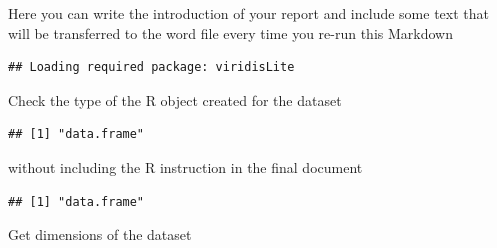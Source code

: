 Here you can write the introduction of your report and include some text
that will be transferred to the word file every time you re-run this
Markdown

\begin{Shaded}
\begin{Highlighting}[]
\end{Highlighting}
\end{Shaded}

\begin{verbatim}
## Loading required package: viridisLite
\end{verbatim}

\begin{Shaded}
\begin{Highlighting}[]

\StringTok{ }\NormalTok{(}\NormalTok{(}\NormalTok{), } \NormalTok{(}\NormalTok{, }\NormalTok{))}

\end{Highlighting}
\end{Shaded}

Check the type of the R object created for the dataset

\begin{Shaded}
\begin{Highlighting}[]
\end{Highlighting}
\end{Shaded}

\begin{verbatim}
## [1] "data.frame"
\end{verbatim}

without including the R instruction in the final document

\begin{verbatim}
## [1] "data.frame"
\end{verbatim}

Get dimensions of the dataset

\begin{Shaded}
\begin{Highlighting}[]
\end{Highlighting}
\end{Shaded}

